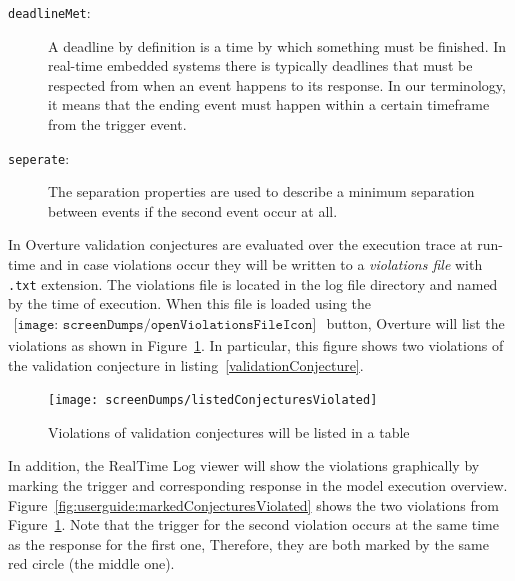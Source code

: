 \documentclass{overturerepchap}
\begin{document}
\begin{description}
\item[\texttt{deadlineMet}:] A deadline by definition is a time by which something must be finished. In real-time embedded systems there is typically deadlines that must be respected from when an event happens to its response. In our terminology, it means that the ending event must happen within a certain timeframe from the trigger event.
\item[\texttt{seperate}:] The separation properties are used to describe a minimum separation between events if the second event occur at all.
\end{description}

In Overture validation conjectures are evaluated over the execution trace at run-time and in case violations occur they will be written to a \textit{violations file} with \texttt{.txt} extension. The violations file is located in the log file directory and named by the time of execution. When this file is loaded using the $
\begin{array}{l}
\texttt{[image: screenDumps/openViolationsFileIcon]}
\end{array}
$ button, Overture will list the violations as shown in Figure~\ref{fig:userguide:listedConjecturesViolated}. In particular, this figure shows two violations of the validation conjecture in listing~\ref{validationConjecture}.

\begin{figure}[htp]
\begin{center}
  \texttt{[image: screenDumps/listedConjecturesViolated]}
  \caption{Violations of validation conjectures will be listed in a table}
  \label{fig:userguide:listedConjecturesViolated}
\end{center}
\end{figure}

In addition, the RealTime Log viewer will show the violations graphically by
marking the trigger and corresponding response in the model execution overview.
Figure~\ref{fig:userguide:markedConjecturesViolated} shows the two violations
from Figure~\ref{fig:userguide:listedConjecturesViolated}. Note that the trigger
for the second violation occurs at the same time as the response for the first one,
Therefore, they are both marked by the same red circle (the middle one).
\end{document}
